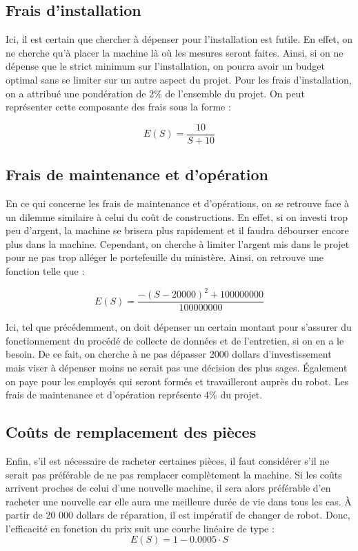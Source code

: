 \subsection{Frais d'installation}
Ici, il est certain que chercher à dépenser pour l’installation est futile. En effet, on ne cherche qu’à placer la machine là où les mesures seront faites. Ainsi, si on ne dépense que le strict minimum sur l’installation, on pourra avoir un budget optimal sans se limiter sur un autre aspect du projet. Pour les frais d'installation, on a attribué une pondération de 2\% de l'ensemble du projet. 
On peut représenter cette composante des frais sous la forme :

\begin{equation}
E(S) = \frac{10}{S+10}
\label{eq:bareme_frais_installation}
\end{equation}

\subsection{Frais de maintenance et d'opération}
En ce qui concerne les frais de maintenance et d’opérations, on se retrouve face à un dilemme similaire à celui du coût de constructions. En effet, si on investi trop peu d’argent, la machine se brisera plus rapidement et il faudra débourser encore plus dans la machine. Cependant, on cherche à limiter l’argent mis dans le projet pour ne pas trop alléger le portefeuille du ministère.
Ainsi, on retrouve une fonction telle que :

\begin{equation}
    E(S) = \frac{−(S−20000)^2+ 100000000}{100000000}
    \label{eq:bareme_frais_maintenance}
\end{equation}

Ici, tel que précédemment, on doit dépenser un certain montant pour s’assurer du fonctionnement du procédé de collecte de données et de l’entretien, si on en a le besoin. De ce fait, on cherche à ne pas dépasser 2000 dollars d’investissement mais viser à dépenser moins ne serait pas une décision des plus sages. Également on paye pour les employés qui seront formés et travailleront auprès du robot. Les frais de maintenance et d'opération représente 4\% du projet.

\subsection{Coûts de remplacement des pièces}
Enfin, s’il est nécessaire de racheter certaines pièces, il faut considérer s’il ne serait pas préférable de ne pas remplacer complètement la machine. Si les coûts arrivent proches de celui d’une nouvelle machine, il sera alors préférable d’en racheter une nouvelle car elle aura une meilleure durée de vie dans tous les cas. À partir de 20 000 dollars de réparation, il est impératif de changer de robot. Donc, l’efficacité en fonction du prix suit une courbe linéaire de type :
\begin{equation}
    E(S) = 1-0.0005\cdot S
\label{eq:bareme_cout_remplacement}
\end{equation}

